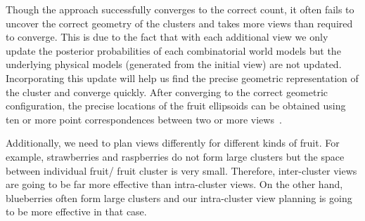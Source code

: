 Though the approach successfully converges to the correct count, it often fails to uncover the correct geometry of the clusters and takes more views than required to converge. This is due to the fact that with each additional view we only update the posterior probabilities of each combinatorial world models but the underlying physical models (generated from the initial view) are not updated. Incorporating this update will help us find the precise geometric representation of the cluster and converge quickly. After converging to the correct geometric configuration, the precise locations of the fruit ellipsoids can be obtained using ten or more point correspondences between two or more views~\cite{cross1998quadric}. 

Additionally, we need to plan views differently for different kinds of fruit. For example, strawberries and raspberries do not form large clusters but the space between individual fruit/ fruit cluster is very small. Therefore, inter-cluster views are going to be far more effective than intra-cluster views. On the other hand, blueberries often form large clusters and our intra-cluster view planning is going to be more effective in that case.


